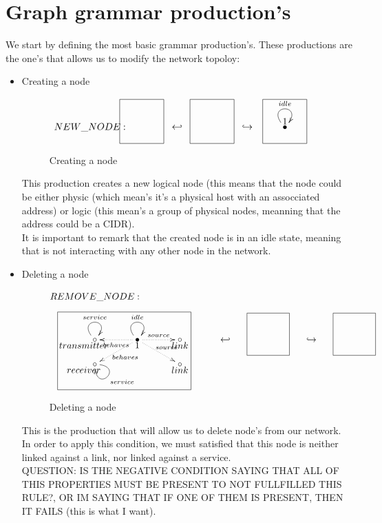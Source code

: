\documentclass[envcountsect,runningheads]{llncs}
\begin{document}
\section{Graph grammar production's}

We start by defining the most basic grammar production's. These 
productions are the one's that allows us to modify the network topoloy:


\begin{itemize}
  \item Creating a node
  \begin{figure}[H]
    \[
       \xymatrix@C=25pt@R=16pt
       {
         {}
         \POS[]-<4.5pc,0pc>\drop{NEW\_NODE:}
         \POS[]+<0pc,.5pc> *+=<3.8pc,3.8pc>[F-]{} & {\hookleftarrow} &
         {}
         \POS[]+<0pc,.5pc> *+=<3.8pc,3.8pc>[F-]{} & {\hookrightarrow} &
         {\bullet} \ar@(ul,ur)^{idle}
         \POS[]+<0pc,.5pc> *+=<3.8pc,3.8pc>[F-]{1} &
       }
    \]
    \caption{Creating a node}
    \protect\label{fig:nodecreation}
  \end{figure}
  This production creates a new logical node (this means that 
  the node could be either physic (which mean's it's a physical host with an 
  assocciated address) or logic (this mean's a group of physical nodes, meanning
  that the address could be a CIDR). \\
  It is important to remark that the created node is in an idle state, meaning 
  that is not interacting with any other node in the network. \\ 

  \item Deleting a node
  \begin{figure}[H]
    \[
       \xymatrix@C=35pt@R=16pt
       {
         {}\POS[]-<0pc,0pc>\drop{REMOVE\_NODE:}
         \\
         \\
         \circ \ar@(ul,ur)^{service} \POS[]-<1pc,.5pc>\drop{transmitter}&
         {\bullet} \ar@(ul,ur)^{idle} \ar@{.>}^{behaves}[l] \ar@{.>}^{behaves}[dl]
         \ar@{.>}^{source}[r] \ar@{.>}^{source}[dr] 
         \POS[]-<0pc,.5pc>\drop{1} &
         \circ \POS[]-<0pc,.5pc>\drop{link}
         \POS[]+<-5pc,-1pc> *+=<12pc,7pc>[F-]{} & {\hookleftarrow} &
         {}
         \POS[]+<0pc,.5pc> *+=<3.8pc,3.8pc>[F-]{} & {\hookrightarrow} &
         {}
         \POS[]+<0pc,.5pc> *+=<3.8pc,3.8pc>[F-]{} &
         \\
         \circ \ar@(r,d)^{service} \POS[]-<1pc,.5pc>\drop{receiver} & &
         \circ \POS[]-<0pc,.5pc>\drop{link}
       }
    \]
    \caption{Deleting a node}
    \protect\label{fig:nodedeletion}
  \end{figure}
  This is the production that will allow us to delete node's from our network. \\ 
  In order to apply this condition, we must satisfied that this node is neither 
  linked against a link, nor linked against a service.\\
  QUESTION: IS THE NEGATIVE CONDITION SAYING THAT ALL OF THIS PROPERTIES 
  MUST BE PRESENT TO NOT FULLFILLED THIS RULE?, OR IM SAYING THAT IF ONE OF
  THEM IS PRESENT, THEN IT FAILS (this is what I want).\\
   

\end{itemize}
\end{document}
